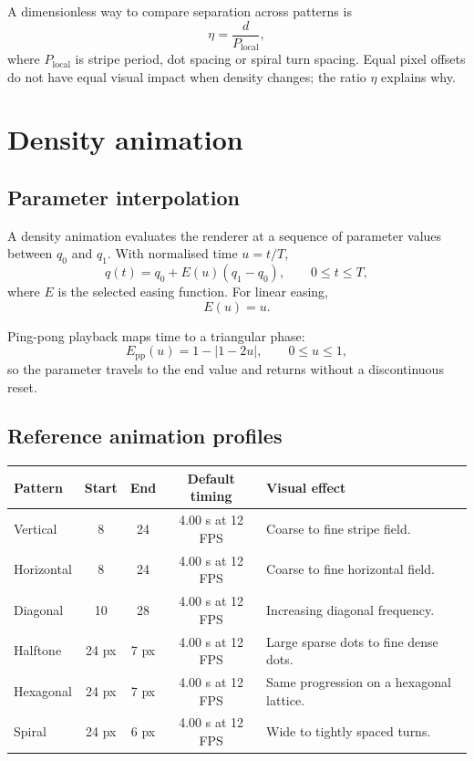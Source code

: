 \documentclass[10.5pt,a4paper]{article}
\begin{document}
A dimensionless way to compare separation across patterns is
\begin{equation}
\eta=\frac{d}{P_{\mathrm{local}}},
\end{equation}
where $P_{\mathrm{local}}$ is stripe period, dot spacing or spiral turn spacing. Equal pixel offsets do not have equal visual impact when density changes; the ratio $\eta$ explains why.

\section{Density animation}
\subsection{Parameter interpolation}
A density animation evaluates the renderer at a sequence of parameter values between $q_0$ and $q_1$. With normalised time $u=t/T$,
\begin{equation}
q(t)=q_0+E(u)(q_1-q_0),
\qquad 0\le t\le T,
\end{equation}
where $E$ is the selected easing function. For linear easing,
\begin{equation}
E(u)=u.
\end{equation}

Ping-pong playback maps time to a triangular phase:
\begin{equation}
E_{\mathrm{pp}}(u)=1-\left|1-2u\right|,
\qquad 0\le u\le 1,
\end{equation}
so the parameter travels to the end value and returns without a discontinuous reset.

\subsection{Reference animation profiles}
\begin{tabularx}{\linewidth}{@{}lcccX@{}}
\toprule
Pattern & Start & End & Default timing & Visual effect \\
\midrule
Vertical & 8 & 24 & 4.00 s at 12 FPS & Coarse to fine stripe field. \\
Horizontal & 8 & 24 & 4.00 s at 12 FPS & Coarse to fine horizontal field. \\
Diagonal & 10 & 28 & 4.00 s at 12 FPS & Increasing diagonal frequency. \\
Halftone & 24 px & 7 px & 4.00 s at 12 FPS & Large sparse dots to fine dense dots. \\
Hexagonal & 24 px & 7 px & 4.00 s at 12 FPS & Same progression on a hexagonal lattice. \\
Spiral & 24 px & 6 px & 4.00 s at 12 FPS & Wide to tightly spaced turns. \\
\bottomrule
\end{tabularx}
\end{document}
